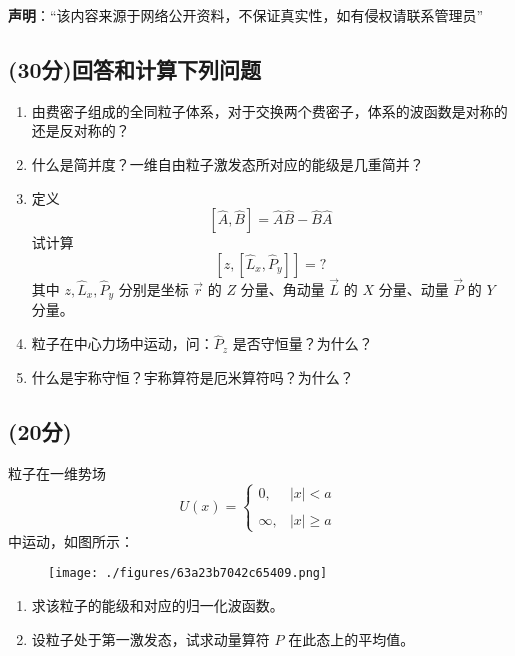 
\textbf{声明}：“该内容来源于网络公开资料，不保证真实性，如有侵权请联系管理员”

\subsection{(30分)回答和计算下列问题}
\begin{enumerate}
\item 由费密子组成的全同粒子体系，对于交换两个费密子，体系的波函数是对称的还是反对称的？
\item 什么是简并度？一维自由粒子激发态所对应的能级是几重简并？
\item 定义
\[
[\hat{A}, \hat{B}] = \hat{A} \hat{B} - \hat{B} \hat{A} ~
\]
试计算
\[
[z, [\hat{L}_x, \hat{P}_y]] = ?~
\]
其中 $z, \hat{L}_x, \hat{P}_y$ 分别是坐标 $\vec r$ 的 $Z$ 分量、角动量 $\vec{L}$ 的 $X$ 分量、动量 $\vec{P}$ 的 $Y$ 分量。
\item 粒子在中心力场中运动，问：$\hat P_z$ 是否守恒量？为什么？
\item 什么是宇称守恒？宇称算符是厄米算符吗？为什么？
\end{enumerate}
\subsection{(20分)}
粒子在一维势场
\[U(x) =  \begin{cases}   0, & |x| < a \\\\  \infty, & |x| \geq a   \end{cases}~\]
中运动，如图所示：
\begin{figure}[ht]
\centering
\texttt{[image: ./figures/63a23b7042c65409.png]}
\caption{} \label{fig_XMU_1}
\end{figure}
\begin{enumerate}
    \item 求该粒子的能级和对应的归一化波函数。
    \item 设粒子处于第一激发态，试求动量算符 $P$ 在此态上的平均值。
\end{enumerate}